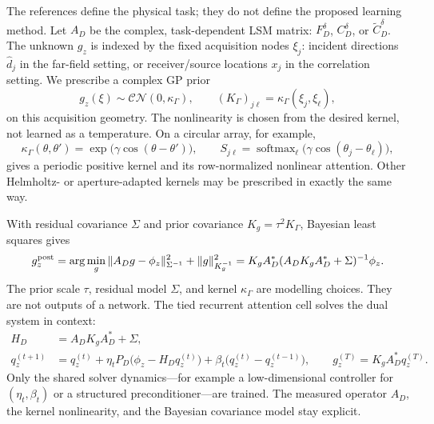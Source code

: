 \documentclass[10pt]{article}
\begin{document}
The references define the physical task; they do not define the proposed
learning method.  Let $A_D$ be the complex, task-dependent LSM matrix:
$F_D^\delta$, $C_D^\delta$, or $\widetilde C_D^\delta$.  The unknown
$g_z$ is indexed by the fixed acquisition nodes $\xi_j$: incident directions
$\widehat d_j$ in the far-field setting, or receiver/source locations $x_j$ in
the correlation setting.  We prescribe a complex GP prior
\begin{equation}
 g_z(\xi)\sim\mathcal{CN}(0,\kappa_\Gamma),\qquad
 (K_\Gamma)_{j\ell}=\kappa_\Gamma(\xi_j,\xi_\ell),
 \label{eq:gp-prior}
\end{equation}
on this acquisition geometry.  The nonlinearity is chosen from the desired
kernel, not learned as a temperature.  On a circular array, for example,
\begin{equation}
 \kappa_\Gamma(\theta,\theta')
 =\exp\!\bigl(\gamma\cos(\theta-\theta')\bigr),\qquad
 S_{j\ell}
 =\operatorname{softmax}_{\ell}
 \bigl(\gamma\cos(\theta_j-\theta_\ell)\bigr),
 \label{eq:periodic-softmax}
\end{equation}
gives a periodic positive kernel and its row-normalized nonlinear attention.
Other Helmholtz- or aperture-adapted kernels may be prescribed in exactly the
same way.

With residual covariance $\Sigma$ and prior covariance
$K_g=\tau^2K_\Gamma$, Bayesian least squares gives
\begin{equation}
 g_z^{\rm post}
 =\arg\min_g
 \|A_Dg-\phi_z\|_{\Sigma^{-1}}^2+\|g\|_{K_g^{-1}}^2
 =K_gA_D^*(A_DK_gA_D^*+\Sigma)^{-1}\phi_z.
 \label{eq:bayesian-lsm}
\end{equation}
The prior scale $\tau$, residual model $\Sigma$, and kernel
$\kappa_\Gamma$ are modelling choices.  They are not outputs of a network.
The tied recurrent attention cell solves the dual system in context:
\begin{align}
 H_D&=A_DK_gA_D^*+\Sigma,\nonumber\\
 q_z^{(t+1)}
 &=q_z^{(t)}
 +\eta_tP_D\bigl(\phi_z-H_Dq_z^{(t)}\bigr)
 +\beta_t\bigl(q_z^{(t)}-q_z^{(t-1)}\bigr),\qquad
 g_z^{(T)}=K_gA_D^*q_z^{(T)}.
 \label{eq:loop}
\end{align}
Only the shared solver dynamics---for example a low-dimensional controller for
$(\eta_t,\beta_t)$ or a structured preconditioner---are trained.  The measured
operator $A_D$, the kernel nonlinearity, and the Bayesian covariance model stay
explicit.
\end{document}
